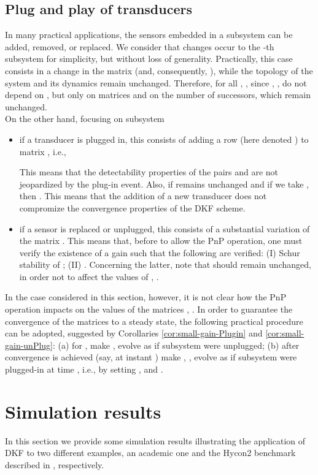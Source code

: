 \documentclass[journal,10pt,draftcls,onecolumn]{IEEEtran}
\begin{document}
\subsection{Plug and play of transducers}
In many practical applications, the sensors embedded in a subsystem can be added, removed, or replaced. We consider that changes occur to the -th subsystem for simplicity, but without loss of generality. Practically, this case consists in a change in the matrix  (and, consequently, ), while the topology of the system and its dynamics remain unchanged. Therefore, for all , , since , , do not depend on , but only on matrices  and on the number of successors, which remain unchanged.\\
On the other hand, focusing on subsystem 
\begin{itemize}
\item if a transducer is plugged in, this consists of adding a row (here denoted ) to matrix , i.e.,

This means that the detectability properties of the pairs  and  are not jeopardized by the plug-in event. Also, if  remains unchanged and if we take , then . This means that the addition of a new transducer does not compromize the convergence properties of the DKF scheme.
\item if a sensor is replaced or unplugged, this consists of a substantial variation of the matrix . This means that, before to allow the PnP operation, one must verify the existence of a gain  such that the following are verified: (I) Schur stability of ; (II) . Concerning the latter, note that  should remain unchanged, in order not to affect the values of , .
\end{itemize}
In the case considered in this section, however, it is not clear how the PnP operation impacts on the values of the matrices , . In order to guarantee the convergence of the matrices  to a steady state, the following practical procedure can be adopted, suggested by Corollaries \ref{cor:small-gain-Plugin} and \ref{cor:small-gain-unPlug}: (a) for , make ,  evolve as if subsystem  were unplugged; (b) after convergence is achieved (say, at instant ) make , ,  evolve as if subsystem  were plugged-in at time , i.e., by setting ,  and .
\section{Simulation results}
\label{sec:Exs}
In this section we provide some simulation results illustrating the application of DKF to two different examples, an academic one and the Hycon2 benchmark described in \cite{SR-GFT:12}, respectively.
\end{document}
